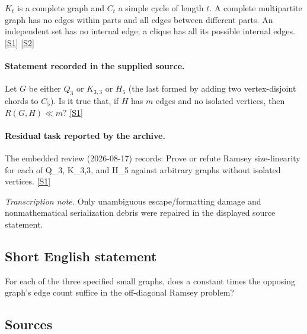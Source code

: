 \documentclass[11pt,a4paper]{article}
\newcommand{\sref}[2]{\hyperlink{source:#1:#2}{[S#2]}}
\begin{document}
$K_t$ is a complete graph and $C_t$ a simple cycle of length $t$. A complete multipartite graph has no edges within parts and all edges between different parts. An independent set has no internal edge; a clique has all its possible internal edges. \sref{2183}{1} \sref{2183}{2}

\paragraph{Statement recorded in the supplied source.}
Let $G$ be either $Q_3$ or $K_{3,3}$ or $H_5$ (the last formed by adding two vertex-disjoint chords to $C_5$). Is it true that, if $H$ has $m$ edges and no isolated vertices, then $ R(G,H)\ll m? $ \sref{2183}{1}

\paragraph{Residual task reported by the archive.}

The embedded review (2026-08-17) records: Prove or refute Ramsey size-linearity for each of Q\_3, K\_{3,3}, and H\_5 against arbitrary graphs without isolated vertices. \sref{2183}{1}

{\small\emph{Transcription note.} Only unambiguous escape/formatting damage and nonmathematical serialization debris were repaired in the displayed source statement.}

\subsection{Short English statement}

For each of the three specified small graphs, does a constant times the opposing graph's edge count suffice in the off-diagonal Ramsey problem?

\subsection{Sources}
\end{document}
